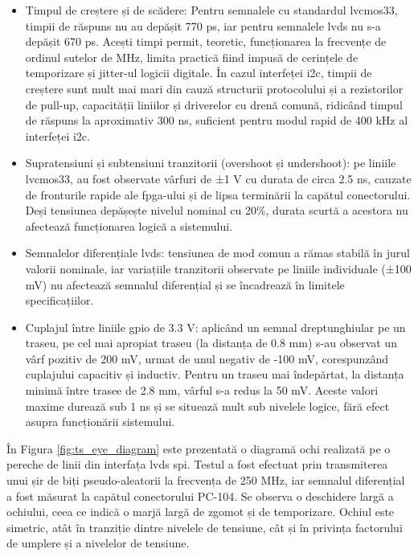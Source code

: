 \documentclass[12pt,a4paper]{report}
\begin{document}
\begin{itemize}
    \item Timpul de creștere și de scădere: Pentru semnalele cu standardul \gls{lvcmos33}, timpii de răspuns nu au depășit 770 ps, iar pentru semnalele \gls{lvds} nu s-a depășit 670 ps. Acești timpi permit, teoretic, funcționarea la frecvențe de ordinul sutelor de MHz, limita practică fiind impusă de cerințele de temporizare și jitter-ul logicii digitale. În cazul interfeței \gls{i2c}, timpii de creștere sunt mult mai mari din cauză structurii protocolului și a rezistorilor de pull-up, capacității liniilor și driverelor cu drenă comună, ridicând timpul de răspuns la aproximativ 300 ns, suficient pentru modul rapid de 400 kHz al interfeței \gls{i2c}.
    \item Supratensiuni și subtensiuni tranzitorii (overshoot și undershoot): pe liniile \gls{lvcmos33}, au fost observate vârfuri de ±1 V cu durata de circa 2.5 ns, cauzate de fronturile rapide ale \gls{fpga}-ului și de lipsa terminării la capătul conectorului. Deși tensiunea depășește nivelul nominal cu 20\%, durata scurtă a acestora nu afectează funcționarea logică a sistemului.
    \item Semnalelor diferențiale \gls{lvds}: tensiunea de mod comun a rămas stabilă în jurul valorii nominale, iar variațiile tranzitorii observate pe liniile individuale (±100 mV) nu afectează semnalul diferențial și se încadrează în limitele specificațiilor.
    \item Cuplajul între liniile \gls{gpio} de 3.3 V: aplicând un semnal dreptunghiular pe un traseu, pe cel mai apropiat traseu (la distanța de 0.8 mm) s-au observat un vârf pozitiv de 200 mV, urmat de unul negativ de -100 mV, corespunzând cuplajului capacitiv și inductiv. Pentru un traseu mai îndepărtat, la distanța minimă între trasee de 2.8 mm, vârful s-a redus la 50 mV. Aceste valori maxime durează sub 1 ns și se situează mult sub nivelele logice, fără efect asupra funcționării sistemului.
\end{itemize}

În Figura \ref{fig:ts_eye_diagram} este prezentată o diagramă ochi realizată pe o pereche de linii din interfața \gls{lvds} \gls{spi}. Testul a fost efectuat prin transmiterea unui șir de biți pseudo-aleatorii la frecvența de 250 MHz, iar semnalul diferențial a fost măsurat la capătul conectorului PC-104. Se observa o deschidere largă a ochiului, ceea ce indică o marjă largă de zgomot și de temporizare. Ochiul este simetric, atât în tranziție dintre nivelele de tensiune, cât și în privința factorului de umplere și a nivelelor de tensiune.
\end{document}
